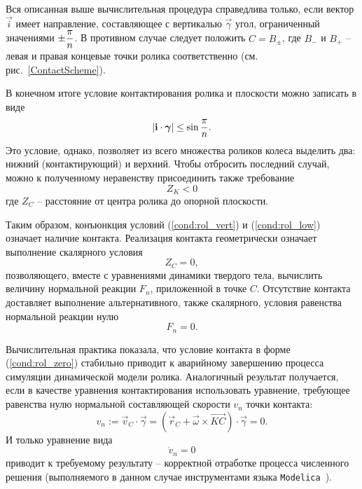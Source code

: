 
Вся описанная выше вычислительная процедура справедлива только, если вектор $\vec{i}$ имеет направление, составляющее с вертикалью $\vec{\gamma}$ угол, ограниченный значениями $\pm\displaystyle\frac{\displaystyle \pi}{\displaystyle n}$. В противном случае следует положить $C = B_\pm$, где $B_{-}$ и $B_{+}$ -- левая и правая концевые точки ролика соответственно (см. рис.~\ref{ContactScheme}).

В конечном итоге условие контактирования ролика и плоскости можно записать в виде
\begin{equation}\label{cond:rol_vert}
    \left| \boldsymbol{\mathbf{i}} \cdot \boldsymbol{\mathbf{\gamma}} \right| \le \sin\displaystyle\frac{\displaystyle \pi}{\displaystyle n}.
\end{equation}
Это условие, однако, позволяет из всего множества роликов колеса выделить два: нижний (контактирующий) и верхний. Чтобы отбросить последний случай, можно к полученному неравенству присоединить также требование 
\begin{equation}\label{cond:rol_low}
    Z_K < 0
\end{equation}
где $Z_C$ -- расстояние от центра ролика до опорной плоскости.

Таким образом, конъюнкция условий (\ref{cond:rol_vert}) и (\ref{cond:rol_low}) означает наличие контакта. Реализация контакта геометрически означает выполнение скалярного условия
\begin{equation}\label{cond:rol_zero}
    Z_C = 0,
\end{equation}
позволяющего, вместе с уравнениями динамики твердого тела, вычислить величину нормальной реакции $F_n$, приложенной в точке $C$. Отсутствие контакта доставляет выполнение альтернативного, также скалярного, условия равенства нормальной реакции нулю
$$
    F_n = 0.
$$

Вычислительная практика показала, что условие контакта в форме (\ref{cond:rol_zero}) стабильно приводит к аварийному завершению процесса симуляции динамической модели ролика. Аналогичный результат получается, если в качестве уравнения контактирования использовать уравнение, требующее равенства нулю нормальной составляющей скорости $v_n$ точки контакта: 
\begin{equation}\label{eq:cont_vn}
    v_n := \vec{v}_C \cdot \vec{\gamma} = \left(\vec{r}_C + \vec{\omega} \times \overrightarrow{KC}\right) \cdot \vec{\gamma} = 0.
\end{equation}
И только уравнение вида
\begin{equation}\label{eq:cont_Dvn}
    \dot{v}_n = 0
\end{equation}
приводит к требуемому результату -- корректной отработке процесса численного решения (выполняемого в данном случае инструментами языка \texttt{Modelica}~\cite{Fritzson}).

